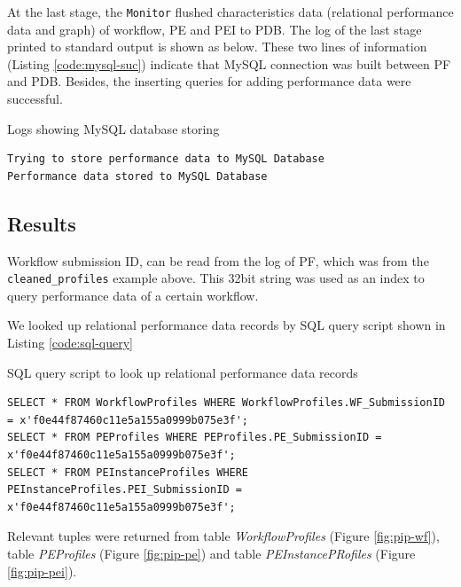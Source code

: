 \documentclass[10pt,twoside,openright,logo]{report}
\begin{document}
At the last stage, the \texttt{Monitor} flushed characteristics data (relational performance data and graph) of workflow, PE and PEI to PDB. The log of the last stage printed to standard output is shown as below. These two lines of information (Listing \ref{code:mysql-suc}) indicate that MySQL connection was built between PF and PDB. Besides, the inserting queries for adding performance data were successful.

\begin{listing}
\caption{Logs showing MySQL database storing}
\label{code:mysql-suc}
\begin{verbatim}
Trying to store performance data to MySQL Database
Performance data stored to MySQL Database
\end{verbatim}
\end{listing}

\subsection{Results}
Workflow submission ID, can be read from the log of PF, which was {\footnotesize{}} from the \texttt{cleaned_profiles} example above. This 32bit string was used as an index to query performance data of a certain workflow.

We looked up relational performance data records by SQL query script shown in Listing \ref{code:sql-query}
\begin{listing}
\caption{SQL query script to look up relational performance data records}
\label{code:sql-query}
\begin{verbatim}
SELECT * FROM WorkflowProfiles WHERE WorkflowProfiles.WF_SubmissionID = x'f0e44f87460c11e5a155a0999b075e3f';
SELECT * FROM PEProfiles WHERE PEProfiles.PE_SubmissionID = x'f0e44f87460c11e5a155a0999b075e3f';
SELECT * FROM PEInstanceProfiles WHERE PEInstanceProfiles.PEI_SubmissionID = x'f0e44f87460c11e5a155a0999b075e3f';
\end{verbatim}
\end{listing}

Relevant tuples were returned from table \textit{WorkflowProfiles} (Figure \ref{fig:pip-wf}), table \textit{PEProfiles} (Figure \ref{fig:pip-pe}) and table \textit{PEInstancePRofiles} (Figure \ref{fig:pip-pei}).
\end{document}
